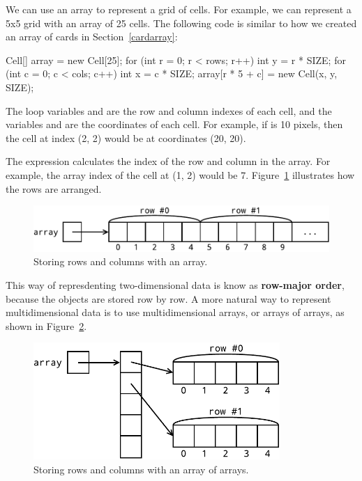 We can use an array to represent a grid of cells.
For example, we can represent a 5x5 grid with an array of 25 cells.
The following code is similar to how we created an array of cards in Section~\ref{cardarray}:

\begin{code}
Cell[] array = new Cell[25];
for (int r = 0; r < rows; r++) {
    int y = r * SIZE;
    for (int c = 0; c < cols; c++) {
        int x = c * SIZE;
        array[r * 5 + c] = new Cell(x, y, SIZE);
    }
}
\end{code}

The loop variables  and  are the row and column indexes of each cell, and the variables  and  are the coordinates of each cell.
For example, if  is 10 pixels, then the cell at index (2, 2) would be at coordinates (20, 20).

The expression  calculates the index of the row and column in the array.
For example, the array index of the cell at (1, 2) would be 7.
Figure~\ref{fig:1D-array} illustrates how the rows are arranged.

\begin{figure}[!ht]
\begin{center}
\includegraphics[width=366pt]{figs/1D-array.pdf}
\caption{Storing rows and columns with an array.}
\label{fig:1D-array}
\end{center}
\end{figure}

This way of represdenting two-dimensional data is know as {\bf row-major order}, because the objects are stored row by row.
A more natural way to represent multidimensional data is to use multidimensional arrays, or arrays of arrays, as shown in Figure~\ref{fig:2D-array}.

\begin{figure}[!ht]
\begin{center}
\includegraphics[width=265pt]{figs/2D-array.pdf}
\caption{Storing rows and columns with an array of arrays.}
\label{fig:2D-array}
\end{center}
\end{figure}

